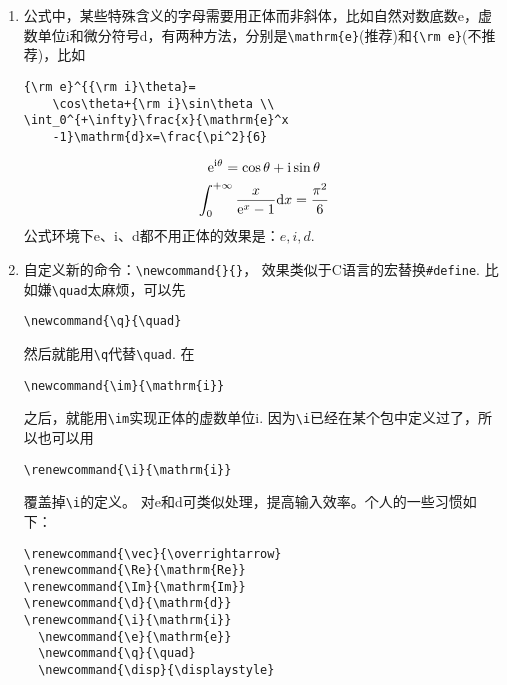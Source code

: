 \documentclass{article}
\newcommand{\q}{\quad}
\begin{document}
\begin{multicols}{2}
\begin{enumerate}
\item 公式中，某些特殊含义的字母需要用正体而非斜体，比如自然对数底数e，虚数单位i和微分符号d，有两种方法，分别是\verb|\mathrm{e}|(推荐)和\verb|{\rm e}|(不推荐)，比如
\begin{lstlisting}
{\rm e}^{{\rm i}\theta}=
    \cos\theta+{\rm i}\sin\theta \\
\int_0^{+\infty}\frac{x}{\mathrm{e}^x
    -1}\mathrm{d}x=\frac{\pi^2}{6}    
\end{lstlisting} 
\begin{gather*}
    {\rm e}^{{\rm i}\theta}=\cos\theta+{\rm i}\sin\theta \\
    \int_{0}^{+\infty}\dfrac{x}{\mathrm{e}^x
    -1}\mathrm{d}x=\dfrac{\pi^2}{6}
\end{gather*}
公式环境下e、i、d都不用正体的效果是：$ e,i,d $.

\item 自定义新的命令：\verb|\newcommand{}{}|，
效果类似于C语言的宏替换\verb|#define|. 
比如嫌\verb|\quad|太麻烦，可以先
\begin{lstlisting}
\newcommand{\q}{\quad}    
\end{lstlisting} 
然后就能用\verb|\q|代替\verb|\quad|. 
在
\begin{lstlisting}
\newcommand{\im}{\mathrm{i}}    
\end{lstlisting} 
之后，就能用\verb|\im|实现正体的虚数单位$ \mathrm{i} $.
因为\verb|\i|已经在某个包中定义过了，所以也可以用
\begin{lstlisting}
\renewcommand{\i}{\mathrm{i}}    
\end{lstlisting} 
覆盖掉\verb|\i|的定义。
对e和d可类似处理，提高输入效率。个人的一些习惯如下：
\begin{lstlisting}
\renewcommand{\vec}{\overrightarrow}
\renewcommand{\Re}{\mathrm{Re}}
\renewcommand{\Im}{\mathrm{Im}}
\renewcommand{\d}{\mathrm{d}}
\renewcommand{\i}{\mathrm{i}} 
  \newcommand{\e}{\mathrm{e}}
  \newcommand{\q}{\quad}
  \newcommand{\disp}{\displaystyle}    
\end{lstlisting} 


\end{enumerate}
\end{multicols}
\end{document}
